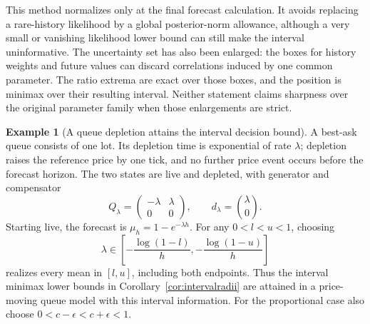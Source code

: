 \documentclass[11pt]{article}
\theoremstyle{plain}
\theoremstyle{definition}
\newtheorem{example}[theorem]{Example}
\theoremstyle{remark}
\begin{document}
This method normalizes only at the final forecast calculation.
It avoids replacing a rare-history likelihood by a global
posterior-norm allowance, although a very small or vanishing
likelihood lower bound can still make the interval uninformative.
The uncertainty set has also been enlarged: the boxes for history
weights and future values can discard correlations induced by one
common parameter. The ratio extrema are exact over those boxes,
and the position is minimax over their resulting interval.
Neither statement claims sharpness over the original parameter
family when those enlargements are strict.

\begin{example}[A queue depletion attains the interval decision bound]
\label{ex:depletionminimax}
A best-ask queue consists of one lot. Its depletion time is
exponential of rate \(\lambda\); depletion raises the reference
price by one tick, and no further price event occurs before the
forecast horizon. The two states are live and depleted, with
generator and compensator
\[
 Q_\lambda=
 \begin{pmatrix}-\lambda&\lambda\\0&0\end{pmatrix},
 \qquad d_\lambda=\binom{\lambda}{0}.
\]
Starting live, the forecast is
\(\mu_h=1-e^{-\lambda h}\). For any
\(0<l<u<1\), choosing
\[
 \lambda\in
 \left[-\frac{\log(1-l)}h,-\frac{\log(1-u)}h\right]
\]
realizes every mean in \([l,u]\), including both endpoints.
Thus the interval minimax lower bounds in
Corollary~\ref{cor:intervalradii} are attained in a price-moving
queue model with this interval information. For the proportional
case also choose \(0<c-\epsilon<c+\epsilon<1\).
\end{example}
\end{document}
